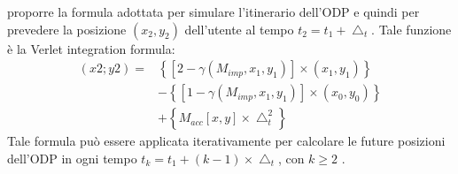 proporre la formula adottata per simulare l'itinerario dell'ODP e quindi per
prevedere la posizione $(x_{2},y_{2})$ dell'utente al tempo $t_{2} = t_{1} +\bigtriangleup_{t}$.
Tale funzione \`e la Verlet integration formula:
\begin{equation}
\begin{matrix}
(x2; y2) = & \left \{ [2 - \gamma(M_{imp},x_{1},y_{1})] \times (x_{1},y_{1}) \right \}\\
 & - \left \{ [1 - \gamma(M_{imp},x_{1},y_{1})] \times (x_{0},y_{0}) \right \} \\
 & + \left \{ M_{acc}[x,y] \times \bigtriangleup_{t}^{2} \right \}
\end{matrix}
\end{equation}
Tale formula pu\`o essere applicata iterativamente per calcolare le future
posizioni dell'ODP in ogni tempo $t_{k} = t_{1} + (k - 1) \times \bigtriangleup_{t}$, con $k \geq 2$ .

